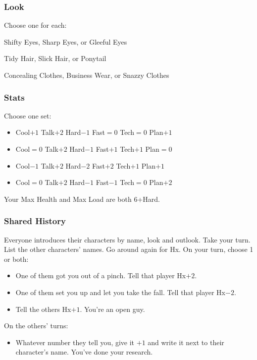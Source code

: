 \subsubsection{Look}
Choose one for each:

Shifty Eyes, Sharp Eyes, or Gleeful Eyes

Tidy Hair, Slick Hair, or Ponytail

Concealing Clothes, Business Wear, or Snazzy Clothes

\subsubsection{Stats}
Choose one set:
\begin{itemize}
\setlength\itemsep{0em}
\item Cool$+1$ Talk$+2$ Hard$-1$ Fast${=}0$ Tech${=}0$ Plan$+1$
\item Cool${=}0$ Talk$+2$ Hard$-1$ Fast$+1$ Tech$+1$ Plan${=}0$
\item Cool$-1$ Talk$+2$ Hard$-2$ Fast$+2$ Tech$+1$ Plan$+1$
\item Cool${=}0$ Talk$+2$ Hard$-1$ Fast$-1$ Tech${=}0$ Plan$+2$
\end{itemize}

Your Max Health and Max Load are both 6+Hard.

\subsubsection{Shared History}
Everyone introduces their characters by name, look and outlook. Take
your turn.  List the other characters' names.  Go around again for
Hx. On your turn, choose 1 or both:
\begin{itemize}
\item One of them got you out of a pinch. Tell that player Hx$+2$.
\item One of them set you up and let you take the fall. Tell that player Hx$-2$.
\item Tell the others Hx$+1$. You're an open guy.
\end{itemize}
On the others’ turns:
\begin{itemize}
\item Whatever number they tell you, give it $+1$ and write it next to
  their character’s name. You've done your research.
\end{itemize}

